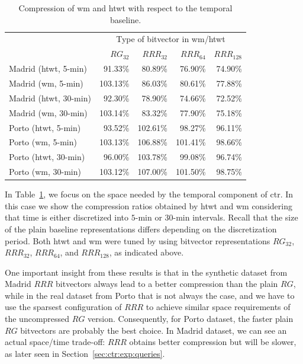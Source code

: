 	\begin{table}[ht]
	\begin{center}
	  \begin{tabular}{|l|*{4}{r}|}
	  \cline{2-5}
	  \multicolumn{1}{c|}{} & \multicolumn{4}{c|}{Type of bitvector in \gls{wm}/\gls{htwt}}\\

	  \multicolumn{1}{c|}{}   & $RG_{32}$& $RRR_{32}$& $RRR_{64}$& $RRR_{128}$\\
	  \hline                                             
	  Madrid (\gls{htwt}, 5-min) &  91.33\% &	 80.89\% &	 76.90\% & 	 74.90\% \\
	  Madrid (\gls{wm}, 5-min)   & 103.13\% &	 86.03\% &	 80.61\% & 	 77.88\% \\
	  Madrid (\gls{htwt}, 30-min)&  92.30\% &	 78.90\% &	 74.66\% &	 72.52\% \\
	  Madrid (\gls{wm}, 30-min)  & 103.14\% &	 83.32\% &	 77.90\% &	 75.18\% \\
	  \hline                  
	  Porto (\gls{htwt}, 5-min)  &  93.52\% &	102.61\% &	 98.27\% &	 96.11\% \\
	  Porto (\gls{wm}, 5-min)    & 103.13\% &	106.88\% &	101.41\% &	 98.66\% \\
	  Porto (\gls{htwt}, 30-min) &  96.00\% &	103.78\% &	 99.08\% &	 96.74\% \\
	  Porto (\gls{wm}, 30-min)   & 103.12\% &	107.00\% &	101.50\% &	 98.75\% \\

	  \hline
	  \cline{2-5}
	  \end{tabular}
	\end{center}
	
	\caption{Compression of \acrshort{wm} and \acrshort{htwt} with respect to the temporal baseline.}
	\label{table:ctr:exp:space:wt}
	\end{table}

    \medskip
	In Table~\ref{table:ctr:exp:space:wt}, we focus on the space needed by the temporal component of \gls{ctr}. 
	In this case we show the compression ratios obtained by \gls{htwt} and \gls{wm} 
	considering that time is either discretized into $5$-min or $30$-min intervals. Recall that the size of the 
	plain baseline representations differs depending on the discretization period. Both \gls{htwt} and \gls{wm} were tuned by
	using bitvector representations $RG_{32}$, $RRR_{32}$, $RRR_{64}$, and $ RRR_{128}$, as indicated above.

	One important insight from these results is that in the synthetic dataset from Madrid $RRR$ bitvectors always lead to a better compression than the plain $RG$, while in the real dataset from Porto that is not always the case, and we have to use the sparsest configuration of $RRR$ to achieve similar space requirements of the uncompressed $RG$ version. Consequently, for Porto dataset, the faster plain $RG$ bitvectors are probably the best choice. In Madrid dataset, we can see an actual space/time trade-off: $RRR$ obtains better compression but will be slower, as later seen in Section~\ref{sec:ctr:exp:queries}.

